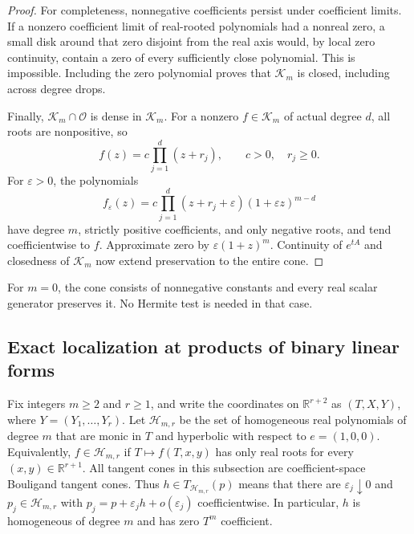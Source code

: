 \documentclass[reqno]{amsart}
\theoremstyle{definition}
\theoremstyle{remark}
\newcommand{\R}{\mathbb R}
\begin{document}
\begin{proof}
For completeness, nonnegative coefficients persist under coefficient
limits.  If a nonzero coefficient limit of real-rooted polynomials had
a nonreal zero, a small disk around that zero disjoint from the real
axis would, by local zero continuity, contain a zero of every
sufficiently close polynomial.  This is impossible.  Including the
zero polynomial proves that $\mathcal K_m$ is closed, including across
degree drops.

Finally, $\mathcal K_m\cap\mathcal O$ is dense in $\mathcal K_m$.
For a nonzero $f\in\mathcal K_m$ of actual degree $d$, all roots are
nonpositive, so
\[
 f(z)=c\prod_{j=1}^d(z+r_j),\qquad c>0,\quad r_j\geq0.
\]
For $\varepsilon>0$, the polynomials
\[
 f_\varepsilon(z)=
 c\prod_{j=1}^d(z+r_j+\varepsilon)
                 (1+\varepsilon z)^{m-d}
\]
have degree $m$, strictly positive coefficients, and only negative
roots, and tend coefficientwise to $f$.  Approximate zero by
$\varepsilon(1+z)^m$.  Continuity of $e^{tA}$ and closedness of
$\mathcal K_m$ now extend preservation to the entire cone.
\end{proof}

For $m=0$, the cone consists of nonnegative constants and every real
scalar generator preserves it.  No Hermite test is needed in that case.

\subsection{Exact localization at products of binary linear forms}

Fix integers $m\geq2$ and $r\geq1$, and write the coordinates on
$\R^{r+2}$ as $(T,X,Y)$, where $Y=(Y_1,\ldots,Y_r)$.
Let $\mathcal H_{m,r}$ be the set of homogeneous real polynomials of
degree $m$ that are monic in $T$ and hyperbolic with respect to
$e=(1,0,0)$.  Equivalently, $f\in\mathcal H_{m,r}$ if
$T\mapsto f(T,x,y)$ has only real roots for every $(x,y)\in\R^{r+1}$.
All tangent cones in this subsection are coefficient-space Bouligand
tangent cones.  Thus $h\in T_{\mathcal H_{m,r}}(p)$ means that there are
$\varepsilon_j\downarrow0$ and $p_j\in\mathcal H_{m,r}$ with
$p_j=p+\varepsilon_jh+o(\varepsilon_j)$ coefficientwise.  In particular,
$h$ is homogeneous of degree $m$ and has zero $T^m$ coefficient.
\end{document}
